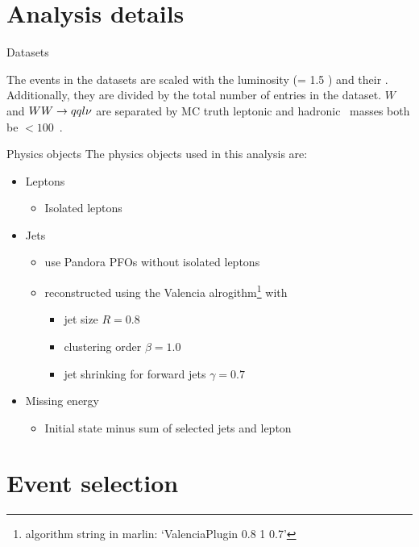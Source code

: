 \documentclass{beamer}
\newcommand{\texpath}{../analysis/tex/tex_full}
\begin{document}
\section{Analysis details}

\begin{frame}{Datasets}

\vspace{-0.5cm}
The events in the datasets are scaled with the luminosity (\lumi = 1.5 \invab) and their \xsec.
%
Additionally, they are divided by the total number of entries in the dataset.
%
$W$ and $WW\rightarrow qql\nu$ are separated by MC truth leptonic and hadronic \Wboson\ masses both be $< 100$~\GeV.
\end{frame}


\begin{frame}{Physics objects}
The physics objects used in this analysis are:
\begin{itemize}
  \item Leptons
  \begin{itemize}
    \item Isolated leptons
  \end{itemize}
  \item Jets
  \begin{itemize}
    \item use Pandora PFOs without isolated leptons
    \item reconstructed using the Valencia alrogithm\footnote{algorithm string in marlin: `ValenciaPlugin 0.8 1 0.7'} with
    \begin{itemize}
      \item jet size $R=0.8$
      \item clustering order $\beta=1.0$
      \item jet shrinking for forward jets $\gamma=0.7$
    \end{itemize}
  \end{itemize}
  \item Missing energy
  \begin{itemize}
    \item Initial state minus sum of selected jets and lepton
  \end{itemize}
\end{itemize}
\end{frame}










\section{Event selection}
\end{document}
